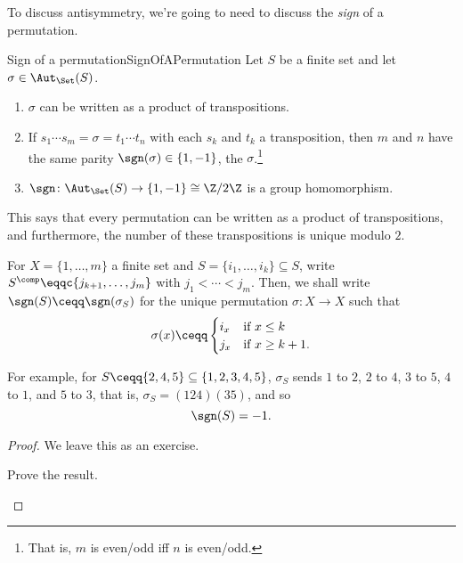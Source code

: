 To discuss antisymmetry, we're going to need to discuss the \emph{sign} of a permutation.
\begin{thm}{Sign of a permutation}{SignOfAPermutation}
	Let $S$ be a finite set and let $\sigma \in \Aut _{\Set}(S)$.
	\begin{enumerate}
		\item $\sigma$ can be written as a product of transpositions.
		\item If $s_1\cdots s_m=\sigma =t_1\cdots t_n$ with each $s_k$ and $t_k$ a transposition, then $m$ and $n$ have the same parity $\sgn (\sigma )\in \{ 1,-1\}$\index[notation]{$\sgn (\sigma )$}, the  $\sigma$.\footnote{That is, $m$ is even/odd iff $n$ is even/odd.}
		\item $\sgn \colon \Aut _{\Set}(S)\rightarrow \{ 1,-1\} \cong \Z /2\Z$ is a group homomorphism.
	\end{enumerate}
	\begin{rmk}
		This says that every permutation can be written as a product of transpositions, and furthermore, the number of these transpositions is unique modulo $2$.
	\end{rmk}
	\begin{rmk}
		For $X=\{ 1,\ldots ,m\}$ a finite set and $S=\{ i_1,\ldots ,i_k\} \subseteq S$, write $S^{\comp}\eqqc \{ j_{k+1},\ldots ,j_m\}$ with $j_1<\cdots <j_m$.  Then, we shall write $\sgn (S)\ceqq \sgn (\sigma _S)$ for the unique permutation $\sigma \colon X\rightarrow X$ such that
		\begin{equation}
			\sigma (x)\ceqq \begin{cases}i_x & \text{if }x\leq k \\ j_x & \text{if }x\geq k+1\text{.}\end{cases}
		\end{equation}
		
		For example, for $S\ceqq \{ 2,4,5\} \subseteq \{ 1,2,3,4,5\}$, $\sigma _S$ sends $1$ to $2$, $2$ to $4$, $3$ to $5$, $4$ to $1$, and $5$ to $3$, that is, $\sigma _S=(124)(35)$, and so
		\begin{equation}
			\sgn (S)=-1.
		\end{equation}
	\end{rmk}
	\begin{proof}
		We leave this as an exercise.
		\begin{exr}[breakable=false]{}{}
			Prove the result.
		\end{exr}
	\end{proof}
\end{thm}


